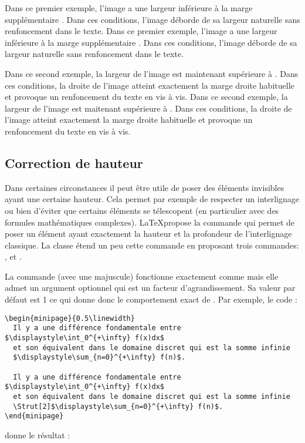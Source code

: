 \documentclass[nocrop]{sesamanuel}
\begin{document}
\begin{changemargin}{1.5cm}{\ExtraMarginRight}
Dans ce
  premier exemple, l'image a une largeur inférieure à la marge
  supplémentaire . Dans ces conditions, l'image
  déborde de sa largeur naturelle sans renfoncement dans le
  texte. Dans ce premier exemple, l'image a une largeur inférieure à
  la marge supplémentaire . Dans ces conditions,
  l'image déborde de sa largeur naturelle sans renfoncement dans le
  texte.

Dans ce second
  exemple, la largeur de l'image est maintenant supérieure à
  . Dans ces conditions, la droite de l'image
  atteint exactement la marge droite habituelle et provoque un
  renfoncement du texte en vis à vis. Dans ce second exemple, la
  largeur de l'image est maitenant supérieure à
  . Dans ces conditions, la droite de l'image
  atteint exactement la marge droite habituelle et provoque un
  renfoncement du texte en vis à vis.
\end{changemargin}

\subsection{Correction de hauteur}
Dans certaines circonstances il peut être utile de poser des éléments
invisibles ayant une certaine hauteur. Cela permet par exemple de
respecter un interlignage ou bien d'éviter que certains éléments se
télescopent (en particulier avec des formules mathématiques
complexes). \LaTeX propose la commande  qui permet de poser
un élément ayant exactement la hauteur et la profondeur de
l'interlignage classique. La classe étend un peu cette commande en
proposant trois commandes: ,  et
.

La commande  (avec une majuscule) fonctionne exactement
comme  mais elle admet un argument optionnel qui est un
facteur d'agrandissement. Sa valeur par défaut est 1 ce qui donne donc
le comportement exact de . Par exemple, le code :
\begin{verbatim}
\begin{minipage}{0.5\linewidth}
  Il y a une différence fondamentale entre $\displaystyle\int_0^{+\infty} f(x)dx$
  et son équivalent dans le domaine discret qui est la somme infinie
  $\displaystyle\sum_{n=0}^{+\infty} f(n)$.

  Il y a une différence fondamentale entre $\displaystyle\int_0^{+\infty} f(x)dx$
  et son équivalent dans le domaine discret qui est la somme infinie
  \Strut[2]$\displaystyle\sum_{n=0}^{+\infty} f(n)$.
\end{minipage}
\end{verbatim}
donne le résultat :
\end{document}
